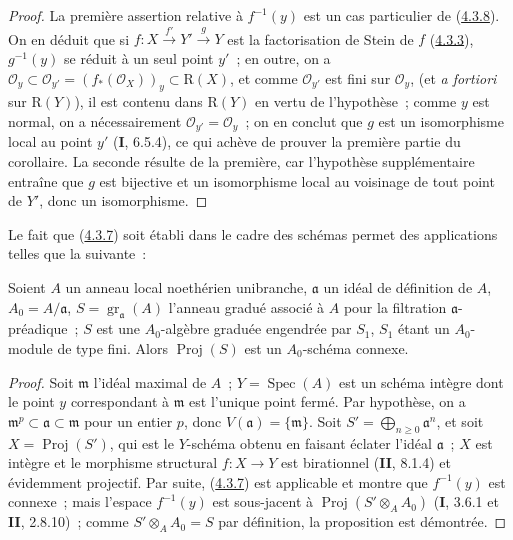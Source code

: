 \begin{proof}
La première assertion relative à $f^{-1}(y)$ est un cas particulier de
(\hyperref[III.4.3.8-fr]{4.3.8}). On en
déduit que si $f:X\xrightarrow{f'}Y'\xrightarrow{g}Y$ est la factorisation
de Stein de $f$ (\hyperref[III.4.3.3-fr]{4.3.3}), $g^{-1}(y)$ se réduit à
un seul point $y'$~; en outre, on a
$\mathcal O_y\subset\mathcal O_{y'}=(f_*(\mathcal O_X))_y
\subset\mathrm R(X)$,
et comme $\mathcal O_{y'}$ est fini sur $\mathcal O_y$, (et \emph{a
fortiori} sur $\mathrm R(Y)$), il est contenu dans $\mathrm R(Y)$ en vertu
de l'hypothèse~; comme $y$ est normal, on a nécessairement
$\mathcal O_{y'}=\mathcal O_y$~; on en conclut que $g$ est un isomorphisme
local au point $y'$ (\textbf{I}, 6.5.4), ce qui achève de prouver la première partie
du corollaire. La seconde résulte de la première, car l'hypothèse
supplémentaire entraîne que $g$ est bijective et un isomorphisme local au
voisinage de tout point de $Y'$, donc un isomorphisme.
\end{proof}

Le fait que (\hyperref[III.4.3.7-fr]{4.3.7}) soit établi dans le cadre des
schémas permet des applications telles que la suivante~:

\begin{proposition}[4.3.13]
\label{III.4.3.13-fr}
Soient $A$ un anneau local noethérien unibranche, $\mathfrak a$ un idéal de
définition de $A$, $A_0=A/\mathfrak a$,
$S=\operatorname{gr}_{\mathfrak a}(A)$ l'anneau gradué associé à $A$ pour
la filtration $\mathfrak a$-préadique~; $S$ est une $A_0$-algèbre graduée
engendrée par $S_1$, $S_1$ étant un $A_0$-module de type fini. Alors
$\operatorname{Proj}(S)$ est un $A_0$-schéma connexe.
\end{proposition}

\begin{proof}
Soit $\mathfrak m$ l'idéal maximal de $A$~; $Y=\operatorname{Spec}(A)$ est
un schéma intègre dont le point $y$ correspondant à $\mathfrak m$ est
l'unique point fermé. Par hypothèse, on a
$\mathfrak m^p\subset\mathfrak a\subset\mathfrak m$ pour un entier $p$,
donc $V(\mathfrak a)=\{\mathfrak m\}$. Soit
$S'=\bigoplus_{n\geq0}\mathfrak a^n$, et soit
$X=\operatorname{Proj}(S')$, qui est le $Y$-schéma obtenu en faisant éclater
l'idéal $\mathfrak a$~; $X$ est intègre et le morphisme structural
$f:X\to Y$ est birationnel (\textbf{II}, 8.1.4) et évidemment projectif. Par suite,
(\hyperref[III.4.3.7-fr]{4.3.7}) est applicable et montre que $f^{-1}(y)$
est connexe~; mais l'espace $f^{-1}(y)$ est sous-jacent à
$\operatorname{Proj}(S'\otimes_AA_0)$ (\textbf{I}, 3.6.1 et \textbf{II}, 2.8.10)~; comme
$S'\otimes_AA_0=S$ par définition, la proposition est démontrée.
\end{proof}


